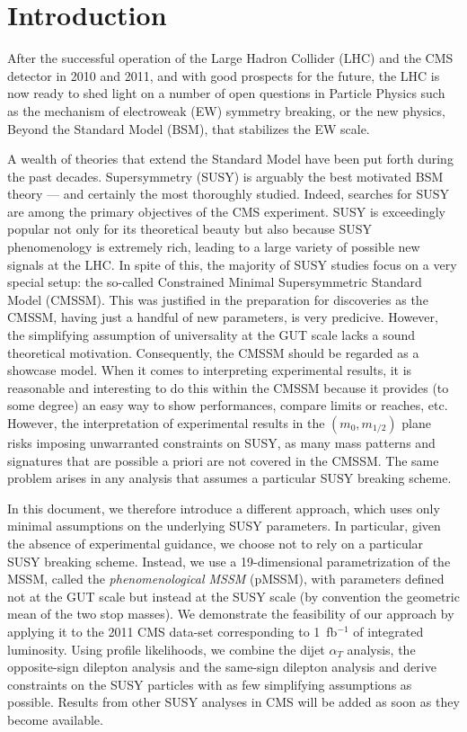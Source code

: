 \section{Introduction}
\label{sec:intro}

After the successful operation of the Large Hadron Collider (LHC) and the CMS detector
in 2010 and 2011, and with good prospects for the future, the LHC is now ready to shed light on a number 
of open questions in Particle Physics 
such as the mechanism of electroweak (EW) symmetry breaking, or the 
new physics, Beyond the Standard Model (BSM), that stabilizes the EW scale. 

A wealth of theories that extend the Standard Model have been put forth during the past decades. Supersymmetry (SUSY) is
arguably the best motivated BSM theory --- and certainly the most 
thoroughly studied. 
Indeed, searches for SUSY are among the primary objectives of the 
CMS experiment. SUSY is exceedingly popular not 
only for its theoretical beauty but also because SUSY phenomenology 
is extremely rich, 
leading to a large variety of possible new signals at the LHC. 
In spite of this, the majority of SUSY studies focus on a very special 
setup: the so-called Constrained Minimal Supersymmetric Standard Model (CMSSM). 
This was justified in the preparation for discoveries as the CMSSM, 
having just a handful of new parameters, is very predicive. However, 
the simplifying assumption of universality at the GUT scale lacks a sound 
theoretical motivation. Consequently, the CMSSM should be regarded as a showcase 
model. When it comes to interpreting experimental results, it is reasonable and interesting to do this within the CMSSM because it 
provides (to some degree) an easy way to show performances, 
compare limits or reaches, etc. However, the interpretation of experimental results in the 
$(m_0,m_{1/2})$ plane risks imposing unwarranted constraints on SUSY, as many 
mass patterns and signatures that are possible a priori are not covered in the CMSSM. 
The same problem arises in any analysis that assumes a particular 
SUSY breaking scheme. 

In this document, we therefore introduce a different approach, which uses only 
minimal assumptions on the underlying SUSY parameters. In particular, given the absence of experimental guidance, we choose
not to rely on a particular SUSY breaking scheme.
Instead, we use a 19-dimensional 
parametrization of the MSSM, called the \emph{phenomenological MSSM} (pMSSM),
with parameters defined not at the GUT scale but instead at the SUSY scale 
(by convention the geometric mean of the two stop masses).
We demonstrate the feasibility of our approach by applying it to 
the 2011 CMS data-set corresponding to 1~fb$^{-1}$ of integrated luminosity.  
Using profile likelihoods, we combine 
the dijet $\alpha_T$ analysis, the opposite-sign dilepton 
analysis and the same-sign dilepton analysis and derive constraints 
on the SUSY particles with as few simplifying assumptions as possible.
Results from other SUSY analyses in CMS will be added as soon as they become available.

